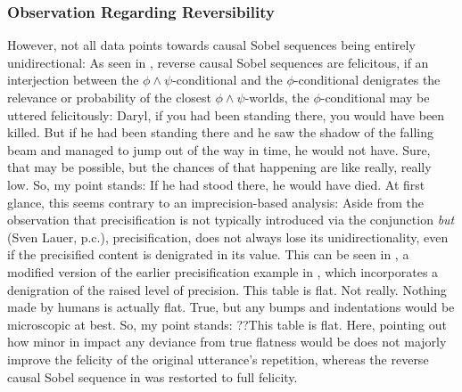 \subsubsection{Observation Regarding Reversibility}
However, not all data points towards causal Sobel sequences being entirely unidirectional: As seen in , reverse causal Sobel sequences are felicitous, if an interjection between the $\phi\land\psi$-conditional and the $\phi$-conditional denigrates the relevance or probability of the closest $\phi\land\psi$-worlds, the $\phi$-conditional may be uttered felicitously: 
\pex{}
	\a	{}Daryl, if you had been standing there, you would have been killed.
	\a{}But if he had been standing there and he saw the shadow of the falling beam and managed to jump out of the way in time, he would not have.
	\a{}Sure, that may be possible, but the chances of that happening are like really, really low. So, my point stands: If he had stood there, he would have died.\hfill\parencite[adapted and modified from][p. 134]{Klecha2014}
\xe
At first glance, this seems contrary to an imprecision-based analysis: Aside from the observation that precisification is not typically introduced via the conjunction \textit{but} (Sven Lauer, p.c.), precisification, does not always lose its unidirectionality, even if the precisified content is denigrated in its value. This can be seen in , a modified version of the earlier precisification example in , which incorporates a denigration of the raised level of precision.
\pex{}
\a{}This table is flat.
\a{}Not really. Nothing made by humans is actually flat.
\a{}True, but any bumps and indentations would be microscopic at best. So, my point stands: ??This table is flat. 
\xe
Here, pointing out how minor in impact any deviance from true flatness would be does not majorly improve the felicity of the original utterance's repetition, whereas the reverse causal Sobel sequence in  was restorted to full felicity.

